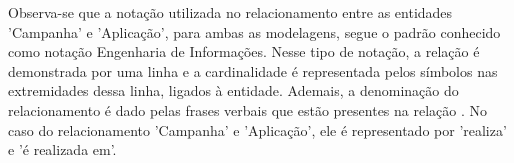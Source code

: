 Observa-se que a notação utilizada no relacionamento entre as entidades 'Campanha' e 'Aplicação', para ambas as modelagens, segue o padrão conhecido como notação Engenharia de Informações. Nesse tipo de notação, a relação é demonstrada por uma linha e a cardinalidade é representada pelos símbolos nas extremidades dessa linha, ligados à entidade. Ademais, a denominação do relacionamento é dado pelas frases verbais que estão presentes na relação  \cite{heuser09banco}. No caso do relacionamento 'Campanha' e 'Aplicação', ele é representado por 'realiza' e 'é realizada em'.











